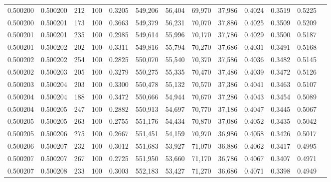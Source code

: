 \begin{tabular}{rrrrrrrrrrrrr}
0.500200 & 0.500200 &   212 & 100 &                                     0.3205 & 549,206 &  56,404 &  69,970 &  37,986 & 0.4024 & 0.3519 & 0.5225 \\
0.500200 & 0.500201 &   173 & 100 &                                     0.3663 & 549,379 &  56,231 &  70,070 &  37,886 & 0.4025 & 0.3509 & 0.5209 \\
0.500201 & 0.500201 &   235 & 100 &                                     0.2985 & 549,614 &  55,996 &  70,170 &  37,786 & 0.4029 & 0.3500 & 0.5187 \\
0.500201 & 0.500202 &   202 & 100 &                                     0.3311 & 549,816 &  55,794 &  70,270 &  37,686 & 0.4031 & 0.3491 & 0.5168 \\
0.500202 & 0.500202 &   254 & 100 &                                     0.2825 & 550,070 &  55,540 &  70,370 &  37,586 & 0.4036 & 0.3482 & 0.5145 \\
0.500202 & 0.500203 &   205 & 100 &                                     0.3279 & 550,275 &  55,335 &  70,470 &  37,486 & 0.4039 & 0.3472 & 0.5126 \\
0.500203 & 0.500204 &   203 & 100 &                                     0.3300 & 550,478 &  55,132 &  70,570 &  37,386 & 0.4041 & 0.3463 & 0.5107 \\
0.500204 & 0.500204 &   188 & 100 &                                     0.3472 & 550,666 &  54,944 &  70,670 &  37,286 & 0.4043 & 0.3454 & 0.5089 \\
0.500204 & 0.500205 &   247 & 100 &                                     0.2882 & 550,913 &  54,697 &  70,770 &  37,186 & 0.4047 & 0.3445 & 0.5067 \\
0.500205 & 0.500205 &   263 & 100 &                                     0.2755 & 551,176 &  54,434 &  70,870 &  37,086 & 0.4052 & 0.3435 & 0.5042 \\
0.500205 & 0.500206 &   275 & 100 &                                     0.2667 & 551,451 &  54,159 &  70,970 &  36,986 & 0.4058 & 0.3426 & 0.5017 \\
0.500206 & 0.500207 &   232 & 100 &                                     0.3012 & 551,683 &  53,927 &  71,070 &  36,886 & 0.4062 & 0.3417 & 0.4995 \\
0.500207 & 0.500207 &   267 & 100 &                                     0.2725 & 551,950 &  53,660 &  71,170 &  36,786 & 0.4067 & 0.3407 & 0.4971 \\
0.500207 & 0.500208 &   233 & 100 &                                     0.3003 & 552,183 &  53,427 &  71,270 &  36,686 & 0.4071 & 0.3398 & 0.4949 \\

\end{tabular}
